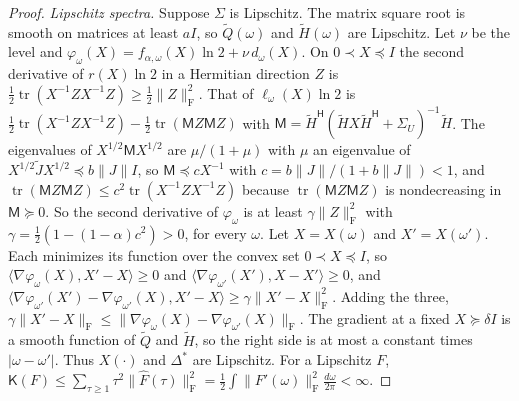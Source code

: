 \documentclass[11pt,onecolumn]{IEEEtran}
\newcommand{\tr}{\operatorname{tr}}
\newcommand{\tQ}{\tilde Q}
\newcommand{\tH}{\tilde H}
\newcommand{\dw}{\tfrac{d\omega}{2\pi}}
\newcommand{\herm}{\mathsf H}
\begin{document}
\begin{proof}
\emph{Lipschitz spectra.} Suppose $\Sigma$ is Lipschitz. The matrix
square root is smooth on matrices at least $aI$, so $\tQ(\omega)$ and
$\tH(\omega)$ are Lipschitz. Let $\nu$ be the level and
$\varphi_\omega(X)=f_{\alpha,\omega}(X)\ln2+\nu\,d_\omega(X)$. On
$0\prec X\preceq I$ the second derivative of $r(X)\ln2$ in a Hermitian
direction $Z$ is $\tfrac12\tr(X^{-1}ZX^{-1}Z)\ge\tfrac12\|Z\|_{\mathrm F}^2$.
That of $\ell_\omega(X)\ln2$ is
$\tfrac12\tr(X^{-1}ZX^{-1}Z)-\tfrac12\tr(\mathsf MZ\mathsf MZ)$ with
$\mathsf M=\tH^{\herm}(\tH X\tH^{\herm}+\Sigma_U)^{-1}\tH$. The eigenvalues of
$X^{1/2}\mathsf MX^{1/2}$ are $\mu/(1+\mu)$ with $\mu$ an eigenvalue of
$X^{1/2}\tilde JX^{1/2}\preceq b\|J\|I$, so $\mathsf M\preceq cX^{-1}$ with
$c=b\|J\|/(1+b\|J\|)<1$, and
$\tr(\mathsf MZ\mathsf MZ)\le c^2\tr(X^{-1}ZX^{-1}Z)$ because
$\tr(\mathsf MZ\mathsf MZ)$ is nondecreasing in $\mathsf M\succeq0$. So the
second derivative of $\varphi_\omega$ is at least
$\gamma\|Z\|_{\mathrm F}^2$ with $\gamma=\tfrac12(1-(1-\alpha)c^2)>0$, for
every $\omega$. Let $X=X(\omega)$ and $X'=X(\omega')$. Each minimizes
its function over the convex set $0\prec X\preceq I$, so
$\langle\nabla\varphi_\omega(X),X'-X\rangle\ge0$ and
$\langle\nabla\varphi_{\omega'}(X'),X-X'\rangle\ge0$, and
$\langle\nabla\varphi_{\omega'}(X')-\nabla\varphi_{\omega'}(X),X'-X\rangle\ge\gamma\|X'-X\|_{\mathrm F}^2$.
Adding the three,
$\gamma\|X'-X\|_{\mathrm F}\le\|\nabla\varphi_\omega(X)-\nabla\varphi_{\omega'}(X)\|_{\mathrm F}$.
The gradient at a fixed $X\succeq\delta I$ is a smooth function of
$\tQ$ and $\tH$, so the right side is at most a constant times
$|\omega-\omega'|$. Thus $X(\cdot)$ and $\Delta^\ast$ are Lipschitz. For
a Lipschitz $F$,
$\mathsf K(F)\le\sum_{\tau\ge1}\tau^2\|\hat F(\tau)\|_{\mathrm F}^2=\tfrac12\int\|F'(\omega)\|_{\mathrm F}^2\dw<\infty$.
\end{proof}
\end{document}

